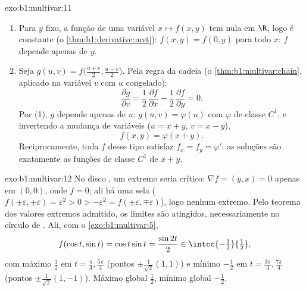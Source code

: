 \begin{solution}{exo:b1:multivar:11}
\begin{enumerate}
  \item Para $y$ fixo, a função de uma variável $x \mapsto
        f(x,y)$ tem 
        nula em $\R$, logo é constante (o \cref{thm:b1:derivative:mvt}): $f(x, y) = f(0, y)$ para todo
        $x$: $f$ depende apenas de $y$.
  \item Seja $g(u, v) = f\bigl(\frac{u+v}2, \frac{u-v}2\bigr)$. Pela regra da cadeia (o \cref{thm:b1:multivar:chain}, aplicado na
        variável $v$ com $u$ congelado):
        \[
        \frac{\partial g}{\partial v}
        = \frac12\,\frac{\partial f}{\partial x}
        - \frac12\,\frac{\partial f}{\partial y} = 0 .
        \]
        Por (1), $g$ depende apenas de $u$: $g(u, v) = \varphi(u)$ com $\varphi$ de
        classe $C^1$, e invertendo a mudança de variáveis ($u = x + y$,
        $v = x - y$),
        \[
        f(x, y) = \varphi(x + y).
        \]
        Reciprocamente, toda $f$ desse tipo satisfaz $f_x = f_y =
        \varphi'$: as
        soluções são exatamente as funções de classe $C^1$ de
        $x + y$.
\end{enumerate}
\end{solution}

\begin{solution}{exo:b1:multivar:12}
No disco , um extremo seria crítico: $\nabla f = (y,
x) = 0$ apenas em $(0,0)$,
onde $f = 0$; ali há uma sela ($f(\pm
\varepsilon, \pm\varepsilon) = \varepsilon^2 > 0 > -\varepsilon^2
= f(\pm\varepsilon, \mp\varepsilon)$), logo nenhum extremo. Pelo
teorema dos valores extremos admitido, os limites são atingidos,
necessariamente no círculo de . Ali, com o \cref{exo:b1:multivar:5},
\[
f(\cos t, \sin t) = \cos t\sin t = \frac{\sin 2t}{2}
\in \intcc{-\tfrac12}{\tfrac12},
\]
com máximo $\frac12$ em $t = \frac\pi4, \frac{5\pi}4$ (pontos $\pm\frac{1}{\sqrt2}(1,1)$) e mínimo $-\frac12$ em $t =
\frac{3\pi}4, \frac{7\pi}4$
(pontos $\pm\frac{1}{\sqrt2}(1,-1)$). Máximo global $\frac12$, mínimo global $-\frac12$.
\end{solution}

